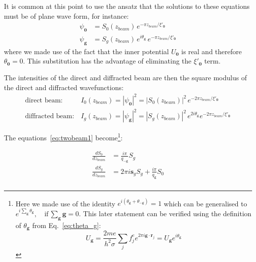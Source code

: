 It is common at this point to use the ansatz that the solutions to these equations must be of plane wave form, for instance:
\begin{equation}
\begin{split}
     \psi_{\mathbf{0}} &= S_0(z_{beam}) \, e^{-\pi z_{beam}/\xi'_{\mathbf{0}} }\\
    \psi_{\mathbf{g}} &= S_g(z_{beam})\,  e^{i \theta_{\mathbf{g}}} \, e^{-\pi z_{beam}/\xi'_{\mathbf{0}} }
\end{split}
\end{equation}
where we made use of the fact that the inner potential $U_\mathbf{0}$ is real and therefore $\theta_\mathbf{0} = 0$. This substitution has the advantage of eliminating the $\xi'_{\mathbf{0}}$ term. 

The intensities of the direct and diffracted beam are then the square modulus of the direct and diffracted wavefunctions:
\begin{equation}
    \begin{split}
        \text{direct beam:}& \, I_0(z_{beam})=  |\psi_{\mathbf{0}}|^2 =  |S_0(z_{beam})|^2 \, e^{-2 \pi z_{beam}/\xi'_{\mathbf{0}} } \\
        \text{diffracted beam:}& \, I_g(z_{beam})=  |\psi_{\mathbf{g}}|^2 =  |S_g(z_{beam})|^2 \,  e^{2 i \theta_{\mathbf{g}}} e^{-2 \pi z_{beam}/\xi'_{\mathbf{0}} } 
    \end{split}
\end{equation}


The equations~\ref{eq:twobeam1} become\footnote{ Here we made use of the identity $e^{i(\theta_{\mathbf{g}} +  \theta_{\mathbf{-g}})} = 1$ which can be generalised to $e^{i \sum_{\mathbf{g}} \theta_{\mathbf{g}}}, \quad \text{if} \, \sum_{\mathbf{g}} \mathbf{g} = 0$. This later statement can be verified using the definition of $\theta_{\mathbf{g}}$ from Eq.~\ref{eq:theta_g}:
\begin{equation*}
    U_{\mathbf{g}} = \frac{2 m e}{h^2 \sigma} \sum_j f^e_j e^{2\pi i \mathbf{g} \cdot \mathbf{r}_j} = U_{\mathbf{g}} e^{i \theta_{\textbf{g}}}
\end{equation*}
}:

\begin{equation}
\label{eq:ODEs}
    \begin{split}
        \frac{d S_0}{d z_{beam}} & = \frac{i \pi}{q_{-\mathbf{g}}} S_g \\
        \frac{d S_g}{d z_{beam}} & = 2 \pi i \mathbf{s}_g S_g +  \frac{i \pi}{q_{\mathbf{g}}} S_0 \\
    \end{split}
\end{equation}


